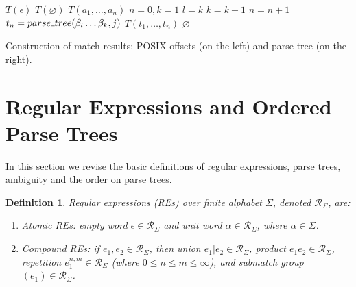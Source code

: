 \documentclass[AMA,STIX1COL]{WileyNJD-v2}
\newcommand{\Xund}{\rule{.4em}{.4pt}}
\newcommand{\XE}{\mathcal{E}}
\newcommand{\XR}{\mathcal{R}}
\newtheorem{Xdef}{Definition}
\begin{document}
\begin{algorithm}[H]
\begin{multicols}{2}
    \Fn {$\underline{parse \Xund tree (u, i)} \smallskip$} {
         {
            \Return $T(\epsilon)$
        }
         {
            \Return $T(\varnothing)$
        }
         {
            \Return $T(a_1, \hdots, a_n)$
        }
         {
            $n = 0, k = 1$ \;
             {
                $l = k$ \;
                 {
                    $k = k + 1$
                }
                $n = n + 1$ \;
                $t_n = parse \Xund tree (\beta_l \dots \beta_k, j)$
            }
            \Return $T(t_1, \dots, t_n)$
        }
        \Return $\varnothing$ 
    }
    \BlankLine

\end{multicols}
\vspace{1.5em}
\caption{Construction of match results: POSIX offsets (on the left) and parse tree (on the right).}
\end{algorithm}
\medskip

\section{Regular Expressions and Ordered Parse Trees}

In this section we revise the basic definitions of
regular expressions,
parse trees,
ambiguity
and the order on parse trees.

    \begin{Xdef}
    \emph{Regular expressions (REs)} over finite alphabet $\Sigma$, denoted $\XR_\Sigma$, are:
    \begin{enumerate}
        \item Atomic REs:
          \emph{empty word} $\epsilon \in \XR_\Sigma$ and
          \emph{unit word} $\alpha \in \XR_\Sigma$, where $\alpha \in \Sigma$.
        \item Compound REs: if $e_1, e_2 \in \XR_\Sigma$, then
          \emph{union} $e_1 | e_2 \in \XR_\Sigma$,
          \emph{product} $e_1 e_2 \in \XR_\Sigma$,
          \emph{repetition} $e_1^{n, m} \in \XR_\Sigma$ (where $0 \leq n \leq m \leq \infty$), and
          \emph{submatch group} $(e_1) \in \XR_\Sigma$.
    \end{enumerate}
    \end{Xdef}
\end{document}

